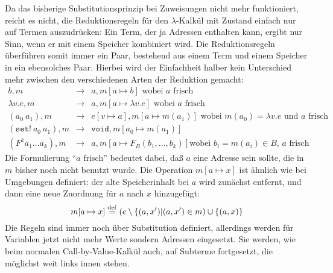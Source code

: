 Da das bisherige Substitutionsprinzip bei Zuweisungen nicht mehr funktioniert, reicht es
nicht, die Reduktionsregeln für den $\lambda$-Kalkül mit Zustand
einfach nur auf Termen auszudrücken: Ein Term, der ja Adressen
enthalten kann, ergibt nur Sinn, wenn er mit einem Speicher kombiniert
wird.  Die Reduktionsregeln überführen somit immer ein Paar, bestehend aus
einem Term und einem Speicher in ein ebensolches Paar.  Hierbei wird der
Einfachheit halber kein Unterschied mehr zwischen den verschiedenen
Arten der Reduktion gemacht:
%
\begin{eqnarray*}
  b, m &\rightarrow& a, m[a\mapsto b] \textrm{ wobei $a$ frisch}
  \\
  \lambda v.e, m &\rightarrow&
  a, m[a\mapsto \lambda v.e]  \textrm{ wobei $a$ frisch}
  \\
  (a_0~a_1), m &\rightarrow& e[v\mapsto a], m[a\mapsto m(a_1)]
  \textrm{ wobei $m(a_0) = \lambda v.e$ und $a$ frisch} 
  \\
  (\mathtt{set!}~a_0~a_1), m &\rightarrow& \mathtt{void}, m[a_0\mapsto m(a_1)]
  \\
  (F^k a_1 \ldots a_k), m &\rightarrow& a, m[a\mapsto F_B(b_1, \ldots, b_k)] \textrm{
    wobei $b_i = m(a_i) \in B$, $a$ frisch}
\end{eqnarray*}
%
Die Formulierung "`$a$ frisch"' bedeutet dabei, daß $a$ eine Adresse
sein sollte, die in $m$ bisher noch nicht benutzt wurde.  Die Operation
$m[a\mapsto x]$ ist ähnlich wie bei Umgebungen definiert: der alte
Speicherinhalt bei $a$ wird zunächst entfernt, und dann eine neue
Zuordnung für $a$ nach $x$ hinzugefügt:
%
\begin{displaymath}
  m[a\mapsto x] \stackrel{\rm def}{=} (e \setminus \{ (a, x') | (a, x') \in m) \cup \{
    (a, x) \}
\end{displaymath}
%
Die Regeln sind immer noch über Substitution definiert, allerdings
werden für Variablen jetzt nicht mehr Werte sondern Adressen
eingesetzt.  Sie werden, wie beim normalen Call-by-Value-Kalkül auch,
auf Subterme fortgesetzt, die möglichst weit links innen stehen.

